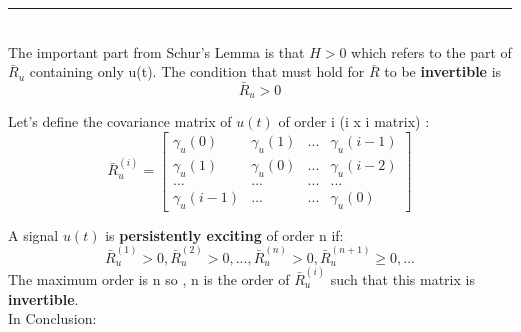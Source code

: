 \par\noindent\rule{\textwidth}{0.4pt}
\\The important part from Schur's Lemma is that $H>0$ which refers to the part of $\bar{R}_{u}$ containing only u(t).
The condition that must hold for $\bar{R}$ to be \textbf{invertible} is
\[
\boxed{\bar{R}_u >0}
\]

Let's define the covariance matrix of $u(t)$ of order i (i x i matrix) :
$$
\bar{R}^{(i)}_{u} = 
	\begin{bmatrix}
       \gamma_{u}(0) & \gamma_{u}(1) & ... & \gamma_{u}(i-1)            \\[0.3em]
       \gamma_{u}(1) & \gamma_{u}(0) &...  & \gamma_{u}(i-2)          \\[0.3em]
       ... & ... & ... 	& ...								   \\[0.3em]
       \gamma_{u}(i-1) & ... & ... & \gamma_{u}(0)
     \end{bmatrix} 
$$

A signal $u(t)$ is \textbf{persistently exciting} of order n if:
\[
\boxed{ \bar{R}^{(1)}_{u} >0, \bar{R}^{(2)}_{u} >0 ,...,\bar{R}^{(n)}_{u} > 0 , \bar{R}^{(n+1)}_{u} \geq 0,... }
\]
The maximum order is n so , n is the order of $\bar{R}^{(i)}_{u}$ such that this matrix is \textbf{invertible}.\\ In Conclusion:\\ \hspace{1cm}

\\

